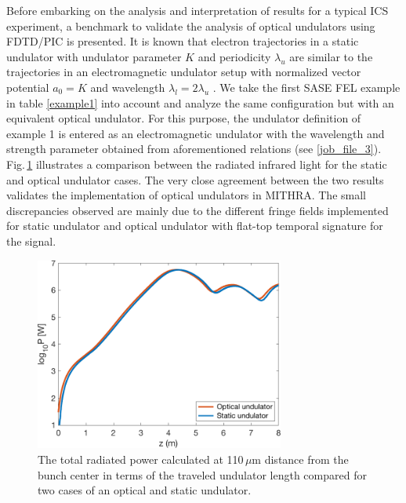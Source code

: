 Before embarking on the analysis and interpretation of results for a typical ICS experiment, a benchmark to validate the analysis of optical undulators using FDTD/PIC is presented.
%
It is known that electron trajectories in a static undulator with undulator parameter $K$ and periodicity $\lambda_u$ are similar to the trajectories in an electromagnetic undulator setup with normalized vector potential $a_0=K$ and wavelength $\lambda_l=2\lambda_u$ \cite{esarey1993nonlinear}.
%
We take the first SASE FEL example in table \ref{example1} into account and analyze the same configuration but with an equivalent optical undulator.
%
For this purpose, the undulator definition of example 1 is entered as an electromagnetic undulator with the wavelength and strength parameter obtained from aforementioned relations (see \ref{job_file_3}).
%
Fig.\,\ref{ICS-benchmark} illustrates a comparison between the radiated infrared light for the static and optical undulator cases.
%
The very close agreement between the two results validates the implementation of optical undulators in MITHRA.
%
The small discrepancies observed are mainly due to the different fringe fields implemented for static undulator and optical undulator with flat-top temporal signature for the signal.
%
\begin{figure}[H]
\centering
\includegraphics[height=2.5in]{./MITHRA_EXAMPLES/Fig7/Fig7.pdf}
\caption{The total radiated power calculated at 110\,$\mu$m distance from the bunch center in terms of the traveled undulator length compared for two cases of an optical and static undulator.}
\label{ICS-benchmark}
\end{figure}

